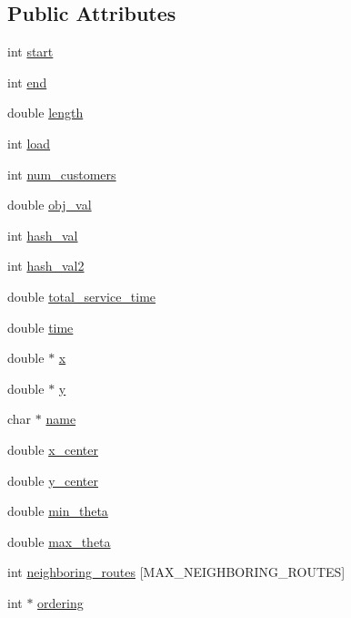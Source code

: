 \subsection*{Public Attributes}
\begin{DoxyCompactItemize}
\item 
int \hyperlink{class_v_r_p_route_af7822965e17374753ff6da1e4d46257c}{start}
\item 
int \hyperlink{class_v_r_p_route_aaa07b108dcc66e0fa8cb87b910c5422c}{end}
\item 
double \hyperlink{class_v_r_p_route_a1b2f5196b37c6e28ded11338719b24cc}{length}
\item 
int \hyperlink{class_v_r_p_route_a193220e68b6e982d24b4f522138d92c1}{load}
\item 
int \hyperlink{class_v_r_p_route_af18e40acb0d146fca047ad56457c772f}{num\_\-customers}
\item 
double \hyperlink{class_v_r_p_route_ac9e01d2cf8bc40618283eaf23c3089b3}{obj\_\-val}
\item 
int \hyperlink{class_v_r_p_route_acae3211284130237208d1e5d4bf3bd06}{hash\_\-val}
\item 
int \hyperlink{class_v_r_p_route_afce4f06d2abdd94d1d89e6ff8f768d42}{hash\_\-val2}
\item 
double \hyperlink{class_v_r_p_route_a2e3a23496201d0974c96e187363c2110}{total\_\-service\_\-time}
\item 
double \hyperlink{class_v_r_p_route_a6584731816b5b2b3782159485ce647db}{time}
\item 
double $\ast$ \hyperlink{class_v_r_p_route_a8333174eb6fd26842408eca57b3e29c7}{x}
\item 
double $\ast$ \hyperlink{class_v_r_p_route_a10340585ced0af5cfc11784f628ea65c}{y}
\item 
char $\ast$ \hyperlink{class_v_r_p_route_a6dffc050d629bc3ab6069cd450382417}{name}
\item 
double \hyperlink{class_v_r_p_route_a0b775a2c29bcd2f7b254befac3d9505c}{x\_\-center}
\item 
double \hyperlink{class_v_r_p_route_ab4a1b843875b5bee390153e1d0970e2b}{y\_\-center}
\item 
double \hyperlink{class_v_r_p_route_a623d67983d2db8b6a5a66789e5d0cf13}{min\_\-theta}
\item 
double \hyperlink{class_v_r_p_route_adae87753adb4e3a0d68b644e52ba5f13}{max\_\-theta}
\item 
int \hyperlink{class_v_r_p_route_a360d284927652d9925ab2eac9dbc3ee4}{neighboring\_\-routes} \mbox{[}MAX\_\-NEIGHBORING\_\-ROUTES\mbox{]}
\item 
int $\ast$ \hyperlink{class_v_r_p_route_afc301079828a5849a0ce1e3e2bc9a9b2}{ordering}
\end{DoxyCompactItemize}


